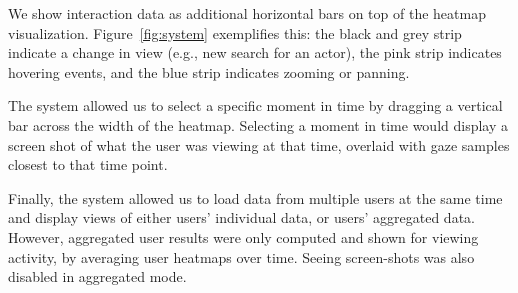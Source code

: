 We show interaction data as additional horizontal bars on top of the heatmap visualization. Figure~\ref{fig:system} exemplifies this: the black and grey strip indicate a change in view (e.g., new search for an actor), the pink strip indicates hovering events, and the blue strip indicates zooming or panning. 

The system allowed us to select a specific moment in time by dragging a vertical bar across the width of the heatmap. Selecting a moment in time would display a screen shot of what the user was viewing at that time, overlaid with gaze samples closest to that time point. 

Finally, the system allowed us to load data from multiple users at the same time and display views of either users' individual data, or users' aggregated data. However, aggregated user results were only computed and shown for viewing activity, by averaging user heatmaps over time. Seeing screen-shots was also disabled in aggregated mode.